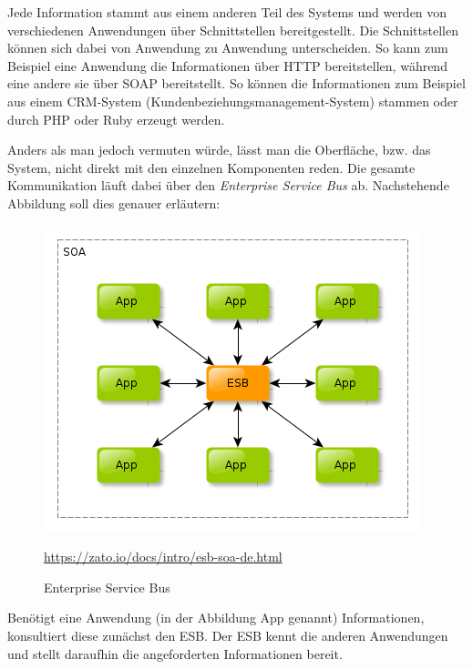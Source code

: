 Jede Information stammt aus einem anderen Teil des Systems und werden von verschiedenen Anwendungen über Schnittstellen bereitgestellt. Die Schnittstellen können sich dabei von Anwendung zu Anwendung unterscheiden. So kann zum Beispiel eine Anwendung die Informationen über HTTP bereitstellen, während eine andere sie über SOAP bereitstellt. So können die Informationen zum Beispiel aus einem CRM-System (Kundenbeziehungsmanagement-System) stammen oder durch PHP oder Ruby erzeugt werden.

Anders als man jedoch vermuten würde, lässt man die Oberfläche, bzw. das System, nicht direkt mit den einzelnen Komponenten reden. Die gesamte Kommunikation läuft dabei über den \textit{Enterprise Service Bus} ab. Nachstehende Abbildung soll dies genauer erläutern:

\begin{figure}[htb]
    \centering 
    \includegraphics[width=\linewidth]{content/images/esb-ok}\
    \caption[ESB]{Enterprise Service Bus}
    \quelle\url{https://zato.io/docs/intro/esb-soa-de.html}
    \label{fig:esb}  
\end{figure}
\newpage
Benötigt eine Anwendung (in der Abbildung App genannt) Informationen, konsultiert diese zunächst den ESB. Der ESB kennt die anderen Anwendungen und stellt daraufhin die angeforderten Informationen bereit.